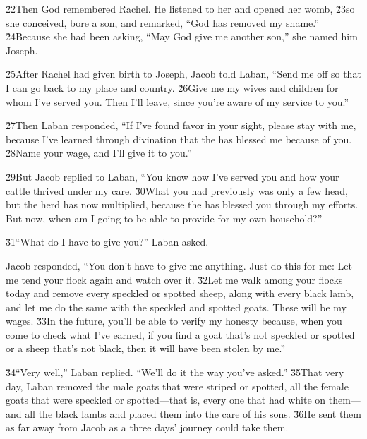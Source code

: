 \v{22}Then God remembered Rachel. He listened to her and opened her womb, \v{23}so she conceived, bore a son, and remarked, ``God has removed my shame.'' \v{24}Because she had been asking, ``May God give me another son,'' she named him Joseph.

\v{25}After Rachel had given birth to Joseph, Jacob told Laban, ``Send me off so that I can go back to my place and country. \v{26}Give me my wives and children for whom I've served you. Then I'll leave, since you're aware of my service to you.''

\v{27}Then Laban responded, ``If I've found favor in your sight, please stay with me, because I've learned through divination that the  has blessed me because of you. \v{28}Name your wage, and I'll give it to you.''

\v{29}But Jacob replied to Laban, ``You know how I've served you and how your cattle thrived under my care. \v{30}What you had previously was only a few head, but the herd has now multiplied, because the  has blessed you through my efforts. But now, when am I going to be able to provide for my own household?''

\v{31}``What do I have to give you?'' Laban asked.

Jacob responded, ``You don't have to give me anything. Just do this for me: Let me tend your flock again and watch over it. \v{32}Let me walk among your flocks today and remove every speckled or spotted sheep, along with every black lamb, and let me do the same with the speckled and spotted goats. These will be my wages. \v{33}In the future, you'll be able to verify my honesty because, when you come to check what I've earned, if you find a goat that's not speckled or spotted or a sheep that's not black, then it will have been stolen by me.''

\v{34}``Very well,'' Laban replied. ``We'll do it the way you've asked.'' \v{35}That very day, Laban removed the male goats that were striped or spotted, all the female goats that were speckled or spotted---that is, every one that had white on them---and all the black lambs and placed them into the care of his sons. \v{36}He sent them as far away from Jacob as a three days' journey could take them.

